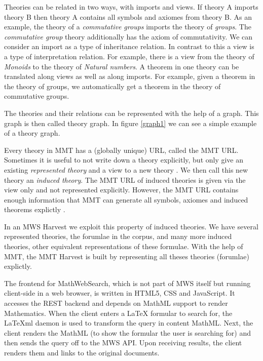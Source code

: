 \documentclass[11pt]{article}
\begin{document}
Theories can be related in two ways, with imports and views. If theory A imports theory B then theory A contains all symbols and axiomes from theory B. As an example, the theory of a \textit{commutative groups} imports the theory of \textit{groups}. The \textit{commutative group} theory additionally has the axiom of commutativity. We can consider an import as a type of inheritance relation. In contrast to this a view is a type of interpretation relation. For example, there is a view from the theory of \textit{Monoids} to the theory of \textit{Natural numbers}. A theorem in one theory can be translated along views as well as along imports. For example, given a theorem in the theory of groups, we automatically get a theorem in the theory of commutative groups.

The theories and their relations can be represented with the help of a graph. This graph is then called theory graph. In figure \ref{graph1} we can see a simple example of a theory graph.



Every theory in MMT has a (globally unique) URL, called the MMT URL. Sometimes it is useful to not write down a theory explicitly, but only give an existing \textit{represented theory} and a view to a new theory . We then call this new theory an \textit{induced theory}. The MMT URL of induced theories is given via the view only and not represented explicitly. However, the MMT URL contains enough information that MMT can generate all symbols, axiomes and induced theorems explictly \cite{IanKohProd:rassmk14} .

In an MWS Harvest we exploit this property of induced theories. We have several represented theories, the forumlae in the corpus, and many more induced theories, other equivalent representations of these formulae. With the help of MMT, the MMT Harvest is built by representing all theses theories (forumlae) explictly.

The frontend for MathWebSearch, which is not part of MWS itself but running client-side in a web browser, is written in HTML5, CSS and JavaScript. It accesses the REST backend and depends on MathML support to render Mathematics. When the client enters a \LaTeX{} formular to search for, the \LaTeX{}ml daemon \cite{latexml-daemon} is used to transform the query in content MathML. Next, the client renders the MathML (to show the formular the user is searching for) and then sends the query off to the MWS API. Upon receiving results, the client renders them and links to the original documents.
\end{document}
